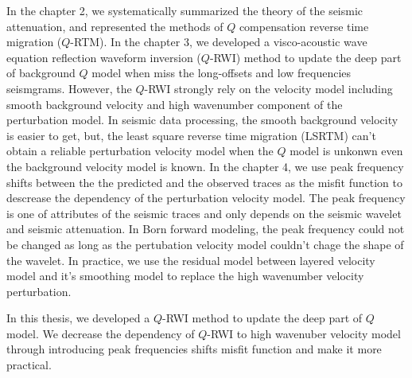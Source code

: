 \begin{englishabstract}
In the chapter 2, we systematically summarized the theory of the seismic attenuation,
and represented the methods of $Q$ compensation reverse time migration ($Q$-RTM).
In the chapter 3, we developed a visco-acoustic wave equation reflection waveform 
inversion ($Q$-RWI) method to update the deep part of background $Q$ model when 
miss the long-offsets and low frequencies seismgrams. However, the $Q$-RWI strongly 
rely on the velocity model including smooth background velocity and 
high wavenumber component of the perturbation model.
In seismic data processing, the smooth background velocity is easier to get, but, 
the least square reverse time migration (LSRTM) can't obtain a reliable perturbation 
velocity model when the $Q$ model is unkonwn even the background 
velocity model is known. In the chapter 4, we use peak frequency 
shifts between the the predicted and the observed traces as the misfit function 
to descrease the dependency of the perturbation velocity model. The peak frequency 
is one of attributes of the seismic traces and only depends on the seismic wavelet 
and seismic attenuation. In Born forward modeling, the peak frequency could not be
changed as long as the pertubation velocity model couldn't chage the shape of the 
wavelet. In practice, we use the residual model between layered velocity model and it's 
smoothing model to replace the high wavenumber velocity perturbation. 

In this thesis, we developed a $Q$-RWI method to update the deep part of $Q$ model.
We decrease the dependency of $Q$-RWI to high wavenuber velocity model through introducing 
peak frequencies shifts misfit function and make it more practical.


  
  
\end{englishabstract}
